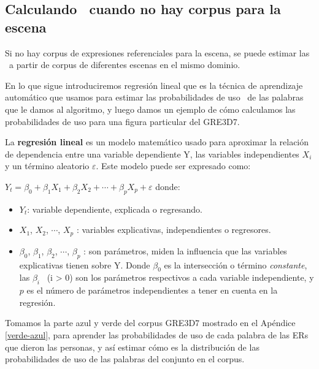 \subsection{Calculando \puse\ cuando no hay corpus para la escena} 
\label{subsec:learning}

%


Si no hay corpus de expresiones referenciales para la escena, se puede estimar las \puse~a partir de corpus de
diferentes escenas en el mismo dominio.

En lo que sigue introduciremos regresi\'on lineal que es la t\'ecnica de aprendizaje autom\'atico que usamos para estimar las probabilidades de uso \puse\ de las palabras que le damos al algoritmo, y luego damos un ejemplo de c\'omo calculamos las probabilidades de uso para una figura particular del GRE3D7.

La \textbf{regresi\'on lineal} es un modelo matem\'atico usado para aproximar la relaci\'on de dependencia entre una variable dependiente Y, las variables independientes $X_i$ y un t\'ermino aleatorio $\varepsilon$. Este modelo puede ser expresado como:

    $Y_t = \beta_0 + \beta_1 X_1 + \beta_2 X_2 + \cdots +\beta_p X_p + \varepsilon$ donde:
\begin{itemize}
    \item $Y_t$: variable dependiente, explicada o regresando.
    \item $X_1$, $X_2$, $\cdots$, $X_p$ : variables explicativas, independientes o regresores.
    \item $\beta_0$, $\beta_1$, $\beta_2$, $\cdots$, $\beta_p$ : son par\'ametros, miden la influencia que las variables explicativas tienen sobre Y. Donde $\beta_0$ es la intersecci\'on o t\'ermino {\it constante}, las $\beta_i$ \ (i > 0) son los par\'ametros respectivos a cada variable independiente, y $p$ es el n\'umero de par\'ametros independientes a tener en cuenta en la regresi\'on.
\end{itemize}

Tomamos la parte azul y verde del corpus GRE3D7 mostrado en el Ap\'endice \ref{verde-azul}, para aprender las probabilidades de uso de cada palabra de las ERs que dieron las personas, y as\'i estimar c\'omo es la distribuci\'on de las probabilidades de uso de las palabras del conjunto \REL en el corpus.

